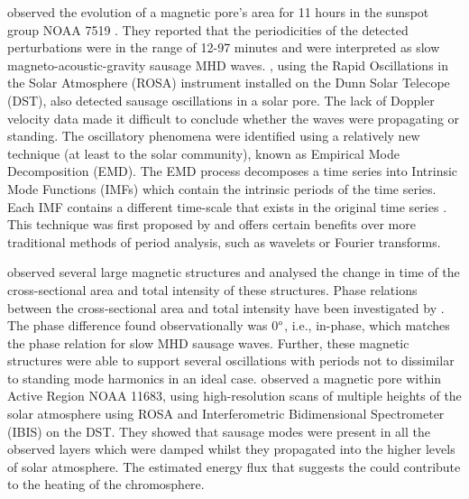     \cite{doretala2008} observed the evolution of a magnetic pore's area for 11 hours in the sunspot group NOAA 7519 \citep[see][]{sobotka,doretalb}.
    They reported that the periodicities of the detected perturbations were in the range of 12-97 minutes and were interpreted as slow magneto-acoustic-gravity sausage MHD waves.
    \citet{morton2011}, using the Rapid Oscillations in the Solar Atmosphere (ROSA) instrument installed on the Dunn Solar Telecope (DST), also detected sausage oscillations in a solar pore. 
    The lack of Doppler velocity data made it difficult to conclude whether the waves were propagating or standing.
    The oscillatory phenomena were identified using a relatively new technique (at least to the solar community), known as Empirical Mode Decomposition (EMD).
    The EMD process decomposes a time series into Intrinsic Mode Functions (IMFs) which contain the intrinsic periods of the time series.
    Each IMF contains a different time-scale that exists in the original time series \citep[see][]{terradas}.
    This technique was first proposed by \citet{huang} and offers certain benefits over more traditional methods of period analysis, such as wavelets or Fourier transforms. 
    
    \cite{Dorotovic2014} observed several large magnetic structures and analysed the change in time of the cross-sectional area and total intensity of these structures.
    Phase relations between the cross-sectional area and total intensity have been investigated by \citet[e.g.,][]{Moreels2013,Moreels2013b}.
    The phase difference found observationally was 0$\degree$, i.e., in-phase, which matches the phase relation for slow MHD sausage waves. 
    Further, these magnetic structures were able to support several oscillations with periods not to dissimilar to standing mode harmonics in an ideal case.    
	\cite{0004-637X-806-1-132} observed a magnetic pore within Active Region NOAA 11683, using high-resolution scans of multiple heights of the solar atmosphere using ROSA and Interferometric Bidimensional Spectrometer (IBIS) on the DST.
	They showed that sausage modes were present in all the observed layers which were damped whilst they propagated into the higher levels of solar atmosphere.
	The estimated energy flux that suggests the could contribute to the heating of the chromosphere.
    
